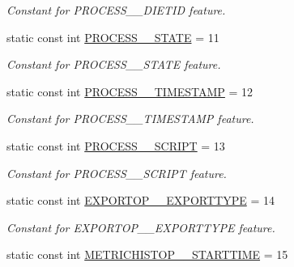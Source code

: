 \begin{DoxyCompactItemize}
\begin{DoxyCompactList}\small\item\em Constant for PROCESS\_\-\_\-DIETID feature. \item\end{DoxyCompactList}\item 
\hypertarget{classIMS__Data_1_1IMS__DataPackage_ab876a740a92c23ebb6100a566746dd32}{
static const int \hyperlink{classIMS__Data_1_1IMS__DataPackage_ab876a740a92c23ebb6100a566746dd32}{PROCESS\_\-\_\-STATE} = 11}
\label{classIMS__Data_1_1IMS__DataPackage_ab876a740a92c23ebb6100a566746dd32}

\begin{DoxyCompactList}\small\item\em Constant for PROCESS\_\-\_\-STATE feature. \item\end{DoxyCompactList}\item 
\hypertarget{classIMS__Data_1_1IMS__DataPackage_aea4f83cc581e278e7d71fa13acdbf57c}{
static const int \hyperlink{classIMS__Data_1_1IMS__DataPackage_aea4f83cc581e278e7d71fa13acdbf57c}{PROCESS\_\-\_\-TIMESTAMP} = 12}
\label{classIMS__Data_1_1IMS__DataPackage_aea4f83cc581e278e7d71fa13acdbf57c}

\begin{DoxyCompactList}\small\item\em Constant for PROCESS\_\-\_\-TIMESTAMP feature. \item\end{DoxyCompactList}\item 
\hypertarget{classIMS__Data_1_1IMS__DataPackage_a8c2bca3330257b414e37560c3a47cc5b}{
static const int \hyperlink{classIMS__Data_1_1IMS__DataPackage_a8c2bca3330257b414e37560c3a47cc5b}{PROCESS\_\-\_\-SCRIPT} = 13}
\label{classIMS__Data_1_1IMS__DataPackage_a8c2bca3330257b414e37560c3a47cc5b}

\begin{DoxyCompactList}\small\item\em Constant for PROCESS\_\-\_\-SCRIPT feature. \item\end{DoxyCompactList}\item 
\hypertarget{classIMS__Data_1_1IMS__DataPackage_a4266732d35cb4d8dc42c292065cb8622}{
static const int \hyperlink{classIMS__Data_1_1IMS__DataPackage_a4266732d35cb4d8dc42c292065cb8622}{EXPORTOP\_\-\_\-EXPORTTYPE} = 14}
\label{classIMS__Data_1_1IMS__DataPackage_a4266732d35cb4d8dc42c292065cb8622}

\begin{DoxyCompactList}\small\item\em Constant for EXPORTOP\_\-\_\-EXPORTTYPE feature. \item\end{DoxyCompactList}\item 
\hypertarget{classIMS__Data_1_1IMS__DataPackage_af1debaacf7da47b8992543f951c75e8f}{
static const int \hyperlink{classIMS__Data_1_1IMS__DataPackage_af1debaacf7da47b8992543f951c75e8f}{METRICHISTOP\_\-\_\-STARTTIME} = 15}
\label{classIMS__Data_1_1IMS__DataPackage_af1debaacf7da47b8992543f951c75e8f}


\end{DoxyCompactItemize}
